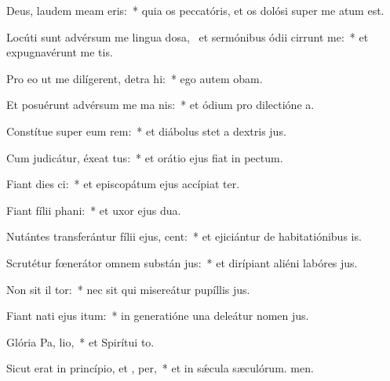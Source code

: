 \item Deus, laudem meam  eris:~* quia os peccatóris, et os dolósi super me atum est.
\item Locúti sunt advérsum me lingua dosa,~\pscross{} et sermónibus ódii cirrunt me:~* et expugnavérunt me tis.
\item Pro eo ut me dilígerent, detra hi:~* ego autem obam.
\item Et posuérunt advérsum me ma  nis:~* et ódium pro dilectióne a.
\item Constítue super eum rem:~* et diábolus stet a dextris jus.
\item Cum judicátur, éxeat tus:~* et orátio ejus fiat in pectum.
\item Fiant dies  ci:~* et episcopátum ejus accípiat ter.
\item Fiant fílii  phani:~* et uxor ejus dua.
\item Nutántes transferántur fílii ejus,  cent:~* et ejiciántur de habitatiónibus is.
\item Scrutétur fœnerátor omnem substán jus:~* et dirípiant aliéni labóres jus.
\item Non sit il tor:~* nec sit qui misereátur pupíllis jus.
\item Fiant nati ejus  itum:~* in generatióne una deleátur nomen jus.
\item Glória Pa,  lio,~* et Spirítui to.
\item Sicut erat in princípio, et ,  per,~* et in sǽcula sæculórum. men.
